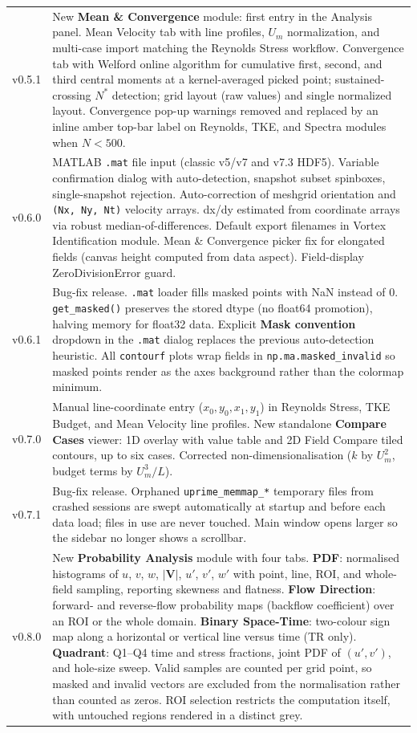 \documentclass[11pt, a4paper]{report}
\newcommand{\uipth}[1]{\textbf{\textcolor{upblue}{#1}}}
\begin{document}
\begin{longtable}{lp{12cm}}
v0.5.1 & New \uipth{Mean \& Convergence} module: first entry in the Analysis panel. Mean Velocity tab with line profiles, $U_m$ normalization, and multi-case import matching the Reynolds Stress workflow. Convergence tab with Welford online algorithm for cumulative first, second, and third central moments at a kernel-averaged picked point; sustained-crossing $N^*$ detection; grid layout (raw values) and single normalized layout. Convergence pop-up warnings removed and replaced by an inline amber top-bar label on Reynolds, TKE, and Spectra modules when $N < 500$. \\
v0.6.0 & MATLAB \texttt{.mat} file input (classic v5/v7 and v7.3 HDF5). Variable confirmation dialog with auto-detection, snapshot subset spinboxes, single-snapshot rejection. Auto-correction of meshgrid orientation and \texttt{(Nx, Ny, Nt)} velocity arrays. dx/dy estimated from coordinate arrays via robust median-of-differences. Default export filenames in Vortex Identification module. Mean \& Convergence picker fix for elongated fields (canvas height computed from data aspect). Field-display ZeroDivisionError guard. \\
v0.6.1 & Bug-fix release. \texttt{.mat} loader fills masked points with NaN instead of 0. \texttt{get\_masked()} preserves the stored dtype (no float64 promotion), halving memory for float32 data. Explicit \uipth{Mask convention} dropdown in the \texttt{.mat} dialog replaces the previous auto-detection heuristic. All \texttt{contourf} plots wrap fields in \texttt{np.ma.masked\_invalid} so masked points render as the axes background rather than the colormap minimum. \\
v0.7.0 & Manual line-coordinate entry ($x_0, y_0, x_1, y_1$) in Reynolds Stress, TKE Budget, and Mean Velocity line profiles. New standalone \uipth{Compare Cases} viewer: 1D overlay with value table and 2D Field Compare tiled contours, up to six cases. Corrected non-dimensionalisation ($k$ by $U_m^2$, budget terms by $U_m^3/L$). \\
v0.7.1 & Bug-fix release. Orphaned \texttt{uprime\_memmap\_*} temporary files from crashed sessions are swept automatically at startup and before each data load; files in use are never touched. Main window opens larger so the sidebar no longer shows a scrollbar. \\
v0.8.0 & New \uipth{Probability Analysis} module with four tabs. \textbf{PDF}: normalised histograms of $u$, $v$, $w$, $|\mathbf{V}|$, $u'$, $v'$, $w'$ with point, line, ROI, and whole-field sampling, reporting skewness and flatness. \textbf{Flow Direction}: forward- and reverse-flow probability maps (backflow coefficient) over an ROI or the whole domain. \textbf{Binary Space-Time}: two-colour sign map along a horizontal or vertical line versus time (TR only). \textbf{Quadrant}: Q1--Q4 time and stress fractions, joint PDF of $(u', v')$, and hole-size sweep. Valid samples are counted per grid point, so masked and invalid vectors are excluded from the normalisation rather than counted as zeros. ROI selection restricts the computation itself, with untouched regions rendered in a distinct grey. \\
\bottomrule
\end{longtable}
\end{document}
